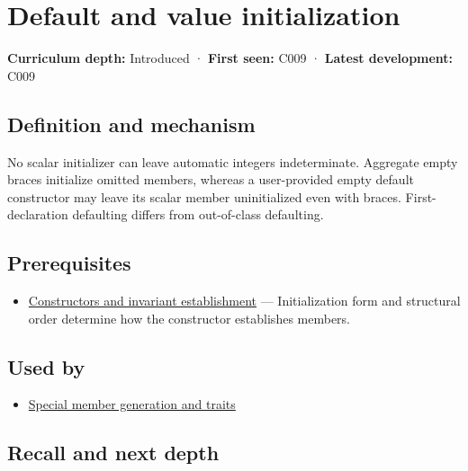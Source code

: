 \hypertarget{appendix-ba8c1a9fe03f}{}\label{referencestart:appendix-ba8c1a9fe03f}
\section{Default and value initialization}\label{appendix-ba8c1a9fe03f-default-and-value-initialization}

\textbf{Curriculum depth:} Introduced · \textbf{First seen:} C009 · \textbf{Latest development:} C009

\begin{allmightroledefinition}

\subsection{Definition and mechanism}\label{appendix-ba8c1a9fe03f-definition-and-mechanism}

No scalar initializer can leave automatic integers indeterminate. Aggregate empty braces initialize omitted members, whereas a user-provided empty default constructor may leave its scalar member uninitialized even with braces. First-declaration defaulting differs from out-of-class defaulting.

\end{allmightroledefinition}

\subsection{Prerequisites}\label{appendix-ba8c1a9fe03f-prerequisites}

\begin{itemize}
\tightlist
\item
  \hyperref[appendix-7f8ec83d0886]{Constructors and invariant establishment} --- Initialization form and structural order determine how the constructor establishes members.
\end{itemize}

\subsection{Used by}\label{appendix-ba8c1a9fe03f-used-by}

\begin{itemize}
\tightlist
\item
  \hyperref[appendix-42e02a12c694]{Special member generation and traits}
\end{itemize}

\subsection{Recall and next depth}\label{appendix-ba8c1a9fe03f-recall-and-next-depth}

